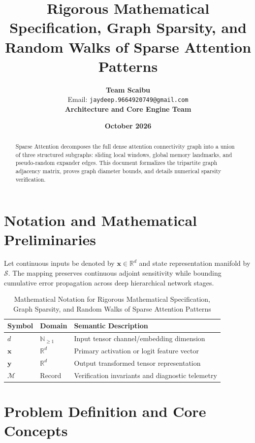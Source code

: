 \documentclass[11pt,a4paper]{article}
\title{\textbf{Rigorous Mathematical Specification, Graph Sparsity, and Random Walks of Sparse Attention Patterns}}
\author{\textbf{Team Scaibu} \\ \small Email: \texttt{jaydeep.9664920749@gmail.com} \\ \small \textbf{Architecture and Core Engine Team}}
\date{\textbf{October 2026}}
\theoremstyle{definition}
\begin{document}
\maketitle

\begin{abstract}
Sparse Attention decomposes the full dense attention connectivity graph into a union of three structured subgraphs: sliding local windows, global memory landmarks, and pseudo-random expander edges. This document formalizes the tripartite graph adjacency matrix, proves graph diameter bounds, and details numerical sparsity verification.
\end{abstract}

\section{Notation and Mathematical Preliminaries}

Let continuous inputs be denoted by $\mathbf{x} \in \mathbb{R}^d$ and state representation manifold by $\mathcal{S}$. The mapping preserves continuous adjoint sensitivity while bounding cumulative error propagation across deep hierarchical network stages.

\begin{table}[h]
\centering
\caption{Mathematical Notation for Rigorous Mathematical Specification, Graph Sparsity, and Random Walks of Sparse Attention Patterns}
\begin{tabular}{lll}
\toprule
\textbf{Symbol} & \textbf{Domain} & \textbf{Semantic Description} \\
\midrule
$d$ & $\mathbb{N}_{\ge 1}$ & Input tensor channel/embedding dimension \\
$\mathbf{x}$ & $\mathbb{R}^d$ & Primary activation or logit feature vector \\
$\mathbf{y}$ & $\mathbb{R}^d$ & Output transformed tensor representation \\
$\mathcal{M}$ & Record & Verification invariants and diagnostic telemetry \\
\bottomrule
\end{tabular}
\end{table}

\section{Problem Definition and Core Concepts}
\end{document}
